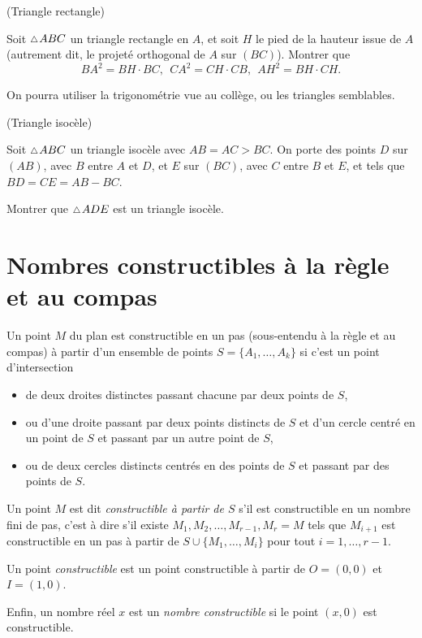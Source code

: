 \documentclass[a4paper,11pt,reqno]{amsart}
\begin{document}
\begin{exo} (Triangle rectangle)

  Soit $\tri ABC$ un triangle rectangle en $A$, et soit $H$ le pied de la hauteur issue de $A$ (autrement dit, le projeté orthogonal de $A$ sur $(BC)$).  Montrer que
  \[
    BA^2=BH \cdot BC,\ \ CA^2=CH \cdot CB,\ \ AH^2=BH \cdot CH.
  \]
  \begin{indication}
    On pourra utiliser la trigonométrie vue au collège, ou les triangles semblables.
  \end{indication}
\end{exo}


\begin{exo} (Triangle isocèle)

  Soit $\tri ABC$ un triangle isocèle avec $AB=AC > BC$. On porte des points $D$ sur $(AB)$, avec $B$ entre $A$ et $D$, et $E$ sur $(BC)$, avec $C$ entre $B$ et $E$, et tels que $BD=CE=AB-BC$.

  Montrer que $\tri ADE$ est un triangle isocèle.
\end{exo}


\section{Nombres constructibles à la règle et au compas}


\begin{convention}\small
  Un point $M$ du plan est constructible en un pas (sous-entendu à la règle et au compas) à partir d'un ensemble de points $S=\{A_1,\ldots,A_k\}$ si c'est un point d'intersection
  \begin{itemize}
    \item de deux droites distinctes passant chacune par deux points de $S$,
    \item ou d'une droite passant par deux points distincts de $S$ et d'un cercle centré en un point de $S$ et passant par un autre point de $S$,
    \item ou de deux cercles distincts centrés en des points de $S$ et passant par des points de $S$.
  \end{itemize}

  Un point $M$ est dit \emph{constructible à partir de $S$} s'il est constructible en un nombre fini de pas, c'est à dire s'il existe $M_1,M_2,\ldots,M_{r-1},M_r=M$ tels que $M_{i+1}$ est constructible en un pas à partir de $S \cup \{M_1,\ldots,M_{i}\}$ pour tout $i=1,\ldots,r-1$.

  Un point \emph{constructible} est un point constructible à partir de $O=(0,0)$ et $I=(1,0)$.

  Enfin, un nombre réel $x$ est un \emph{nombre constructible} si le point $(x,0)$ est constructible.
\end{convention}
\end{document}
